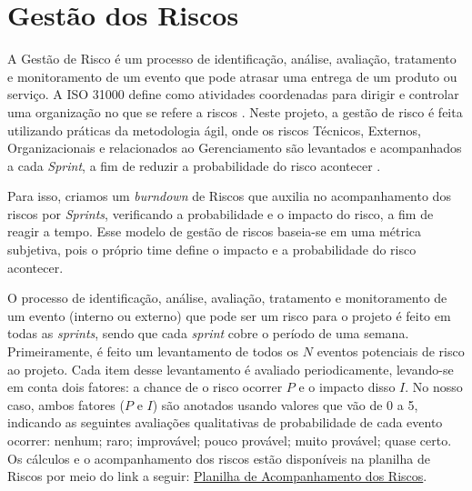 \section{Gestão dos Riscos}
\label{levantamentoRiscos}

A Gestão de Risco é um processo de identificação, análise, avaliação, tratamento e monitoramento de um evento que pode atrasar uma entrega de um produto ou serviço. A ISO 31000 define como atividades coordenadas para dirigir e controlar uma organização no que se refere a riscos \cite{purdy2010iso}.
Neste projeto, a gestão de risco é feita utilizando práticas da metodologia ágil, onde os riscos Técnicos, Externos, Organizacionais e relacionados ao Gerenciamento são levantados e acompanhados a cada  \textit{Sprint}, a fim de reduzir a probabilidade do risco acontecer \cite{cohn_RiskBurndown_blog2010}.

Para isso, criamos um \textit{burndown} de Riscos que auxilia no acompanhamento dos riscos por \textit{Sprints}, verificando a probabilidade e o impacto do risco, a fim de reagir a tempo. Esse modelo de gestão de riscos baseia-se em uma métrica subjetiva, pois o próprio time define o impacto e a probabilidade do risco acontecer. 

O processo de identificação, análise, avaliação, tratamento e monitoramento de um evento (interno ou externo) que pode ser um risco para o projeto é feito em todas as {\em sprints}, sendo que cada {\em sprint} cobre o período de uma semana. Primeiramente, é feito um levantamento de todos os $N$ eventos potenciais de risco ao projeto. Cada item desse levantamento é avaliado periodicamente, levando-se em conta dois fatores: a chance de o risco ocorrer $P$ e o impacto disso $I$. No nosso caso, ambos fatores ($P$ e $I$) são anotados usando valores que vão de 0 a 5, indicando as seguintes avaliações qualitativas de probabilidade de cada evento ocorrer: nenhum; raro; improvável; pouco provável; 
muito provável; quase certo. Os cálculos e o acompanhamento dos riscos estão disponíveis na planilha de Riscos por meio do link a seguir: \href{https://docs.google.com/spreadsheets/d/1TQ4I9uqX-XxH3AdRi01n4jIX4YpIWYOHws1GxpdqUF0/edit?usp=sharing}{Planilha de Acompanhamento dos Riscos}.

